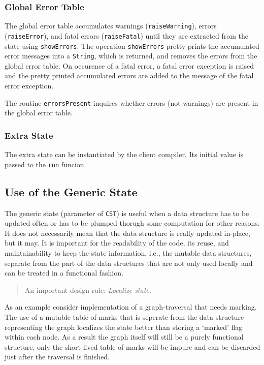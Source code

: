 \documentclass{report}
\newcommand{\code}[1]{\texttt{#1}}
\begin{document}
\subsubsection{Global Error Table}

The global error table accumulates warnings (\code{raiseWarning}), errors
(\code{raiseError}), and fatal errors (\code{raiseFatal}) until they are
extracted from the state using \code{showErrors}. The operation
\code{showErrors} pretty prints the accumulated error messages into a
\code{String}, which is returned, and removes the errors from the global error
table. On occurence of a fatal error, a fatal error exception is raised and the
pretty printed accumulated errors are added to the message of the fatal error
exception.

The routine \code{errorsPresent} inquires whether errors (not warnings) are
present in the global error table. 

\subsubsection{Extra State}

The extra state can be instantiated by the client compiler.  Its initial value 
is passed to the \code{run} funcion.

\subsection{Use of the Generic State}
\label{sec:generic-state}

The generic state (parameter of \code{CST}) is useful when a data structure
has to be updated often or has to be plumped thorugh some computation for
other reasons. It does not necessarily mean that the data structure is really
updated in-place, but it may. It is important for the readability of the code,
its reuse, and maintainability to keep the state information, i.e., the
mutable data structures, separate from the part of the data structures that
are not only used locally and can be treated in a functional fashion.
%
\begin{quote}
  An important design rule: \textit{Localize state.}
\end{quote}
%
As an example consider implementation of a graph-traversal that needs marking.
The use of a mutable table of marks that is seperate from the data structure
representing the graph localizes the state better than storing a `marked' flag
within each node.  As a result the graph itself will still be a purely
functional structure, only the short-lived table of marks will be impure and
can be discarded just after the traversal is finished.
\end{document}
